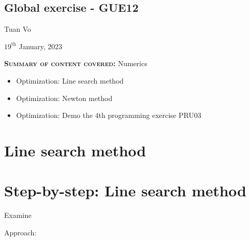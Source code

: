 \documentclass[12pt]{article}
\begin{document}
\begin{center}
	\section*{Global exercise - GUE12}
\end{center}
\begin{center}
	Tuan Vo
\end{center}
\begin{center}
	$19^{\text{th}}$ January, 2023
\end{center}
\textbf{\textsc{Summary of content covered:}} Numerics
\begin{itemize}
	\item[\checkmark] Optimization: Line search method
	\item[\checkmark] Optimization: Newton method
	\item[\checkmark] Optimization: Demo the $4$th programming exercise PRU03
\end{itemize}
\section{Line search method}

\clearpage
\section{Step-by-step: Line search method}
\begin{exampleboxed}
	Examine
\end{exampleboxed}
Approach:\\

\clearpage
\end{document}
